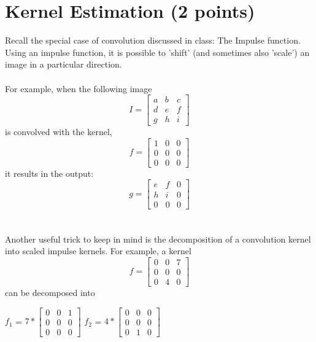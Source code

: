 \section{Kernel Estimation (2 points)}

Recall the special case of convolution discussed in class: The Impulse function. Using an impulse function, it is possible to 'shift' (and sometimes also 'scale') an image in a particular direction.\\
\\For example, when the following image 
\begin{equation}
I = 
	\begin{bmatrix}
    		     a & b & c \\
    		     d & e & f \\
    		     g & h & i 
	   		   \end{bmatrix}
\end{equation}
is convolved with the kernel, 
\begin{equation}
f = 
	\begin{bmatrix}
    		     1 & 0 & 0 \\
    		     0 & 0 & 0 \\
    		     0 & 0 & 0 
	   		   \end{bmatrix}
\end{equation}
it results in the output:
\begin{equation}
g = 
	\begin{bmatrix}
    		     e & f & 0 \\
    		     h & i & 0 \\
    		     0 & 0 & 0 
	   		   \end{bmatrix}
\end{equation}\\
\\Another useful trick to keep in mind is the decomposition of a convolution kernel into scaled impulse kernels. For example, a kernel
\begin{equation}
f = 
	\begin{bmatrix}
    		     0 & 0 & 7 \\
    		     0 & 0 & 0 \\
    		     0 & 4 & 0 
	   		   \end{bmatrix}
\end{equation}
can be decomposed into
\begin{center}
	$f_{1}$ = $7*\begin{bmatrix}
    		     0 & 0 & 1 \\
    		     0 & 0 & 0 \\
    		     0 & 0 & 0 
	   		   \end{bmatrix}$ 
    $f_{2}$ =   $4*\begin{bmatrix}
    		     0 & 0 & 0 \\
    		     0 & 0 & 0 \\
    		     0 & 1 & 0 
	   		   \end{bmatrix}$
\end{center}
